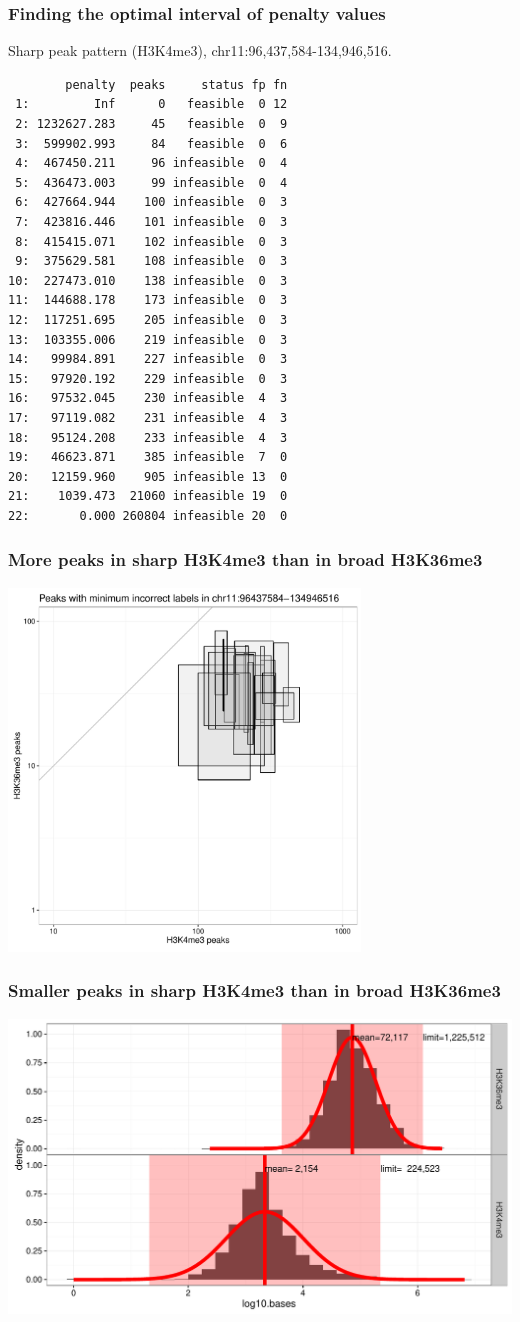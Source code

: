 \documentclass{beamer}
\begin{document}
\begin{frame}[fragile]
  \frametitle{Finding the optimal interval of penalty values}
\vskip 0.2cm Sharp peak pattern (H3K4me3), chr11:96,437,584-134,946,516.
\scriptsize
\begin{verbatim}
        penalty  peaks     status fp fn
 1:         Inf      0   feasible  0 12
 2: 1232627.283     45   feasible  0  9
 3:  599902.993     84   feasible  0  6
 4:  467450.211     96 infeasible  0  4
 5:  436473.003     99 infeasible  0  4
 6:  427664.944    100 infeasible  0  3
 7:  423816.446    101 infeasible  0  3
 8:  415415.071    102 infeasible  0  3
 9:  375629.581    108 infeasible  0  3
10:  227473.010    138 infeasible  0  3
11:  144688.178    173 infeasible  0  3
12:  117251.695    205 infeasible  0  3
13:  103355.006    219 infeasible  0  3
14:   99984.891    227 infeasible  0  3
15:   97920.192    229 infeasible  0  3
16:   97532.045    230 infeasible  4  3
17:   97119.082    231 infeasible  4  3
18:   95124.208    233 infeasible  4  3
19:   46623.871    385 infeasible  7  0
20:   12159.960    905 infeasible 13  0
21:    1039.473  21060 infeasible 19  0
22:       0.000 260804 infeasible 20  0
\end{verbatim}
\end{frame}

\begin{frame}
  \frametitle{More peaks in sharp H3K4me3 than in broad H3K36me3}
  \includegraphics[width=0.7\textwidth]{figure-min-err-peaks-compare}
\end{frame}

\begin{frame}
  \frametitle{Smaller peaks in sharp H3K4me3 than in broad H3K36me3}
  \includegraphics[width=\textwidth]{figure-peak-size-model}
\end{frame}
\end{document}

